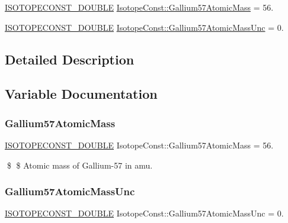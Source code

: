 \begin{DoxyCompactItemize}
\item 
\mbox{\hyperlink{group___isotope_const-_macros_ga8f45a7272ce02c0b4c65c44636ed719a}{I\+S\+O\+T\+O\+P\+E\+C\+O\+N\+S\+T\+\_\+\+D\+O\+U\+B\+LE}} \mbox{\hyperlink{group___isotope_const-_gallium-_ga57_ga0025e492e00766ad8c470492e5feb3fd}{Isotope\+Const\+::\+Gallium57\+Atomic\+Mass}} = 56.
\item 
\mbox{\hyperlink{group___isotope_const-_macros_ga8f45a7272ce02c0b4c65c44636ed719a}{I\+S\+O\+T\+O\+P\+E\+C\+O\+N\+S\+T\+\_\+\+D\+O\+U\+B\+LE}} \mbox{\hyperlink{group___isotope_const-_gallium-_ga57_ga4a82607ac509cd881e9bdba846dbe247}{Isotope\+Const\+::\+Gallium57\+Atomic\+Mass\+Unc}} = 0.
\end{DoxyCompactItemize}


\subsection{Detailed Description}


\subsection{Variable Documentation}
\mbox{\label{group___isotope_const-_gallium-_ga57_ga0025e492e00766ad8c470492e5feb3fd}} 
\subsubsection{\texorpdfstring{Gallium57\+Atomic\+Mass}{Gallium57AtomicMass}}
{\footnotesize\ttfamily \mbox{\hyperlink{group___isotope_const-_macros_ga8f45a7272ce02c0b4c65c44636ed719a}{I\+S\+O\+T\+O\+P\+E\+C\+O\+N\+S\+T\+\_\+\+D\+O\+U\+B\+LE}} Isotope\+Const\+::\+Gallium57\+Atomic\+Mass = 56.}

\$ \$ Atomic mass of Gallium-\/57 in amu. \mbox{\label{group___isotope_const-_gallium-_ga57_ga4a82607ac509cd881e9bdba846dbe247}} 
\subsubsection{\texorpdfstring{Gallium57\+Atomic\+Mass\+Unc}{Gallium57AtomicMassUnc}}
{\footnotesize\ttfamily \mbox{\hyperlink{group___isotope_const-_macros_ga8f45a7272ce02c0b4c65c44636ed719a}{I\+S\+O\+T\+O\+P\+E\+C\+O\+N\+S\+T\+\_\+\+D\+O\+U\+B\+LE}} Isotope\+Const\+::\+Gallium57\+Atomic\+Mass\+Unc = 0.}

